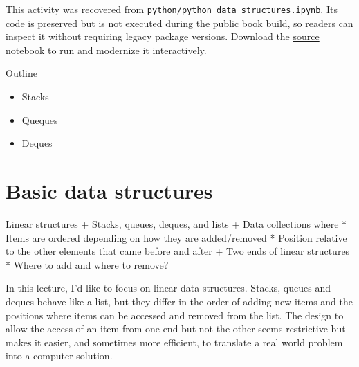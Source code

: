 \documentclass[
  letterpaper,
]{scrbook}
\providecommand{\tightlist}{%
  \setlength{\itemsep}{0pt}\setlength{\parskip}{0pt}}
\begin{document}
\begin{tcolorbox}[enhanced jigsaw, arc=.35mm, bottomrule=.15mm, bottomtitle=1mm, breakable, colback=white, colbacktitle=quarto-callout-note-color!10!white, colframe=quarto-callout-note-color-frame, coltitle=black, left=2mm, leftrule=.75mm, opacityback=0, opacitybacktitle=0.6, rightrule=.15mm, title=\textcolor{quarto-callout-note-color}{\faInfo}\hspace{0.5em}{Historical source and execution note}, titlerule=0mm, toprule=.15mm, toptitle=1mm]

This activity was recovered from
\texttt{python/python\_data\_structures.ipynb}. Its code is preserved
but is not executed during the public book build, so readers can inspect
it without requiring legacy package versions. Download the
\href{../notebooks/python-data-structures.ipynb}{source notebook} to run
and modernize it interactively.

\end{tcolorbox}

Outline

\begin{itemize}
\tightlist
\item
  Stacks
\item
  Queques
\item
  Deques
\end{itemize}

\section*{Basic data structures}\label{basic-data-structures}


Linear structures + Stacks, queues, deques, and lists + Data collections
where * Items are ordered depending on how they are added/removed *
Position relative to the other elements that came before and after + Two
ends of linear structures * Where to add and where to remove?

In this lecture, I'd like to focus on linear data structures. Stacks,
queues and deques behave like a list, but they differ in the order of
adding new items and the positions where items can be accessed and
removed from the list. The design to allow the access of an item from
one end but not the other seems restrictive but makes it easier, and
sometimes more efficient, to translate a real world problem into a
computer solution.
\end{document}
